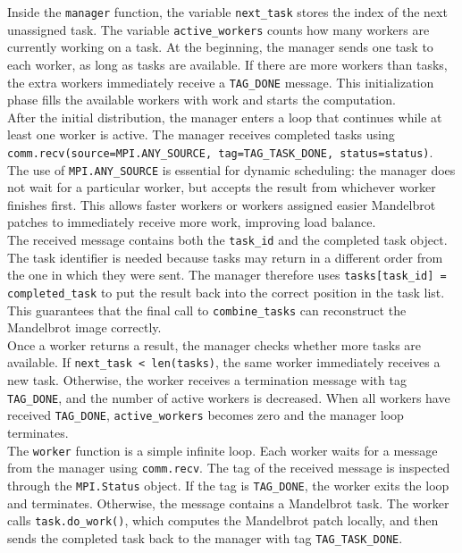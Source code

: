 \documentclass[unicode,10pt,a4paper,oneside,numbers=endperiod,openany]{scrartcl}
\begin{document}
Inside the \texttt{manager} function, the variable \texttt{next\_task} stores the index of the next
unassigned task. The variable \texttt{active\_workers} counts how many workers are currently working
on a task. At the beginning, the manager sends one task to each worker, as long as tasks are available.
If there are more workers than tasks, the extra workers immediately receive a \texttt{TAG\_DONE}
message. This initialization phase fills the available workers with work and starts the computation.\\
After the initial distribution, the manager enters a loop that continues while at least one worker is
active. The manager receives completed tasks using
\texttt{comm.recv(source=MPI.ANY\_SOURCE, tag=TAG\_TASK\_DONE, status=status)}. The use of
\texttt{MPI.ANY\_SOURCE} is essential for dynamic scheduling: the manager does not wait for a
particular worker, but accepts the result from whichever worker finishes first. This allows faster workers
or workers assigned easier Mandelbrot patches to immediately receive more work, improving load
balance.\\
The received message contains both the \texttt{task\_id} and the completed task object. The task
identifier is needed because tasks may return in a different order from the one in which they were sent.
The manager therefore uses \texttt{tasks[task\_id] = completed\_task} to put the result back into the
correct position in the task list. This guarantees that the final call to \texttt{combine\_tasks} can
reconstruct the Mandelbrot image correctly.\\

Once a worker returns a result, the manager checks whether more tasks are available. If
\texttt{next\_task < len(tasks)}, the same worker immediately receives a new task. Otherwise, the
worker receives a termination message with tag \texttt{TAG\_DONE}, and the number of active workers is
decreased. When all workers have received \texttt{TAG\_DONE}, \texttt{active\_workers} becomes zero and
the manager loop terminates.\\

The \texttt{worker} function is a simple infinite loop. Each worker waits for a message from the
manager using \texttt{comm.recv}. The tag of the received message is inspected through the
\texttt{MPI.Status} object. If the tag is \texttt{TAG\_DONE}, the worker exits the loop and terminates.
Otherwise, the message contains a Mandelbrot task. The worker calls \texttt{task.do\_work()}, which
computes the Mandelbrot patch locally, and then sends the completed task back to the manager with tag
\texttt{TAG\_TASK\_DONE}.\\
\end{document}
